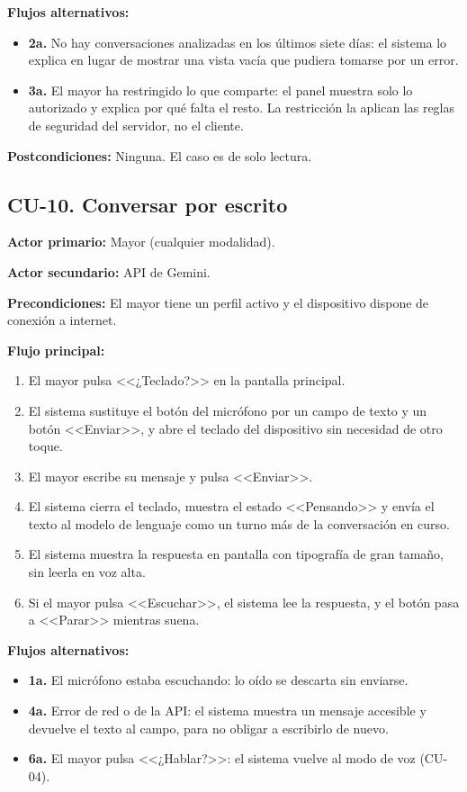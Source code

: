 \noindent\textbf{Flujos alternativos:}
\begin{itemize}[nosep]
    \item \textbf{2a.} No hay conversaciones analizadas en los últimos siete días: el sistema lo explica en lugar de mostrar una vista vacía que pudiera tomarse por un error.
    \item \textbf{3a.} El mayor ha restringido lo que comparte: el panel muestra solo lo autorizado y explica por qué falta el resto. La restricción la aplican las reglas de seguridad del servidor, no el cliente.
\end{itemize}

\noindent\textbf{Postcondiciones:} Ninguna. El caso es de solo lectura.

\bigskip

\subsection*{CU-10. Conversar por escrito}

\noindent\textbf{Actor primario:} Mayor (cualquier modalidad).

\noindent\textbf{Actor secundario:} API de Gemini.

\noindent\textbf{Precondiciones:} El mayor tiene un perfil activo y el dispositivo dispone de conexión a internet.

\noindent\textbf{Flujo principal:}
\begin{enumerate}[nosep]
    \item El mayor pulsa <<¿Teclado?>> en la pantalla principal.
    \item El sistema sustituye el botón del micrófono por un campo de texto y un botón <<Enviar>>, y abre el teclado del dispositivo sin necesidad de otro toque.
    \item El mayor escribe su mensaje y pulsa <<Enviar>>.
    \item El sistema cierra el teclado, muestra el estado <<Pensando>> y envía el texto al modelo de lenguaje como un turno más de la conversación en curso.
    \item El sistema muestra la respuesta en pantalla con tipografía de gran tamaño, sin leerla en voz alta.
    \item Si el mayor pulsa <<Escuchar>>, el sistema lee la respuesta, y el botón pasa a <<Parar>> mientras suena.
\end{enumerate}

\noindent\textbf{Flujos alternativos:}
\begin{itemize}[nosep]
    \item \textbf{1a.} El micrófono estaba escuchando: lo oído se descarta sin enviarse.
    \item \textbf{4a.} Error de red o de la API: el sistema muestra un mensaje accesible y devuelve el texto al campo, para no obligar a escribirlo de nuevo.
    \item \textbf{6a.} El mayor pulsa <<¿Hablar?>>: el sistema vuelve al modo de voz (CU-04).
\end{itemize}

